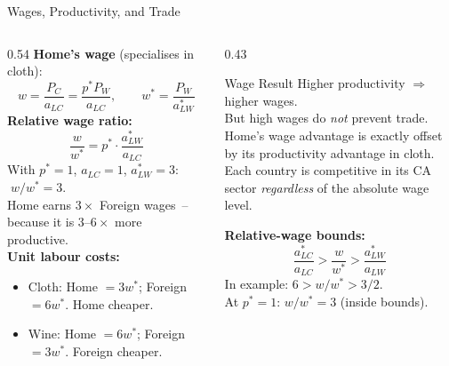 \documentclass[aspectratio=169]{beamer}
\begin{document}
\begin{frame}[shrink=15]{Wages, Productivity, and Trade}
\begin{columns}[T]
\begin{column}{0.54\textwidth}
\textbf{Home's wage} (specialises in cloth):
\[w=\frac{P_C}{a_{LC}}=\frac{p^{*}P_W}{a_{LC}},
  \qquad w^{*}=\frac{P_W}{a_{LW}^{*}}\]
\textbf{Relative wage ratio:}
\[\frac{w}{w^{*}}=p^{*}\!\cdot\!\frac{a_{LW}^{*}}{a_{LC}}\]
With $p^{*}=1$, $a_{LC}=1$, $a_{LW}^{*}=3$:
$\;w/w^{*}=3$.\\[0.3em]
Home earns $3\times$ Foreign wages~-- because it is
$3$--$6\times$ more productive.\\[0.3em]
\textbf{Unit labour costs:}
\begin{itemize}\small
  \item Cloth: Home $=3w^{*}$; Foreign $=6w^{*}$.
        Home cheaper. \checkmark
  \item Wine: Home $=6w^{*}$; Foreign $=3w^{*}$.
        Foreign cheaper. \checkmark
\end{itemize}
\end{column}
\begin{column}{0.43\textwidth}
\begin{insight}{Wage Result}
\small Higher productivity $\Rightarrow$ higher wages.\\
But high wages do \emph{not} prevent trade.\\[0.3em]
Home's wage advantage is exactly offset by its
productivity advantage in cloth.\\[0.3em]
Each country is competitive in its CA sector
\emph{regardless} of the absolute wage level.
\end{insight}
\vspace{0.3em}
\begin{varbox}
\footnotesize\textbf{Relative-wage bounds:}
\[\frac{a_{LC}^{*}}{a_{LC}}>\frac{w}{w^{*}}
  >\frac{a_{LW}^{*}}{a_{LW}}\]
In example: $6>w/w^{*}>3/2$.\\
At $p^{*}=1$: $w/w^{*}=3$ (\checkmark inside bounds).
\end{varbox}
\end{column}
\end{columns}
\end{frame}
\end{document}
